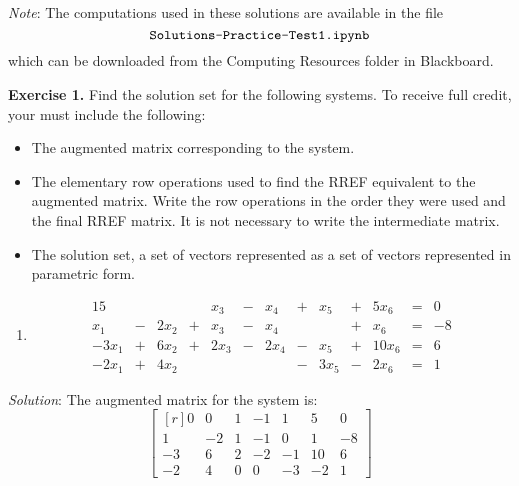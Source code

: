 \documentclass[12pt]{article}
\begin{document}
\emph{Note}: The computations used in these solutions are available in the file 
\[
\text{\texttt{Solutions-Practice-Test1.ipynb}}
\] 
which can be downloaded from the Computing Resources folder in Blackboard.

\textbf{Exercise 1.} Find the solution set for the following systems. To receive full credit, your must include the following:
\begin{itemize}
\item The augmented matrix corresponding to the system.
\item The elementary row operations used to find the RREF equivalent to the augmented matrix. Write the row operations in the order they were used and the final RREF matrix. It is not necessary to write the intermediate matrix.
\item The solution set, a set of vectors represented as a set of vectors represented in parametric form.
\end{itemize} 

\begin{enumerate}
\item \begin{alignat*}{15}
&{}{}&&{}{}&x_{3} &{}-{}& x_{4} &{}+{}& x_{5} &{}+{}& 5 x_{6} &{}={}&0\\ 
x_{1} &{}-{}& 2 x_{2} &{}+{}& x_{3} &{}-{}& x_{4}&{}{}& &{}+{}& x_{6} &{}={}&-8\\ 
- 3 x_{1} &{}+{}& 6 x_{2} &{}+{}& 2 x_{3} &{}-{}& 2 x_{4} &{}-{}& x_{5} &{}+{}& 10 x_{6} &{}={}&6\\ 
- 2 x_{1} &{}+{}& 4 x_{2}&{}{}&&{}{}& &{}-{}& 3 x_{5} &{}-{}& 2 x_{6} &{}={}&1 
\end{alignat*}

\end{enumerate}

\emph{Solution}: The augmented matrix for the system is:
\[
\left[\begin{matrix*}[r]0 & 0 & 1 & -1 & 1 & 5 & 0\\1 & -2 & 1 & -1 & 0 & 1 & -8\\-3 & 6 & 2 & -2 & -1 & 10 & 6\\-2 & 4 & 0 & 0 & -3 & -2 & 1\end{matrix*}\right]
\]
\end{document}
